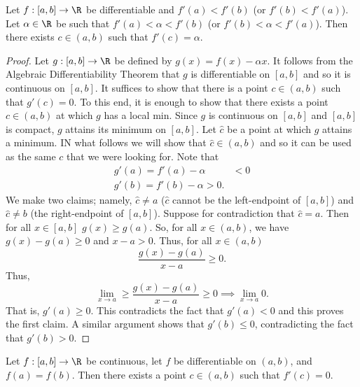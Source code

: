\begin{theorem}
    Let \( f: [a,b] \to \R  \) be differentiable and \( f'(a) < f'(b) \) (or \( f'(b) < f'(a) \)). Let \( \alpha \in \R  \) be such that \( f'(a) < \alpha < f'(b)  \) (or \( f'(b) < \alpha < f'(a) \)). Then there exists \( c \in (a,b) \) such that \( f'(c) = \alpha \).
\end{theorem}
\begin{proof}
    Let \( g:[a,b] \to \R  \) be defined by \( g(x) = f(x) - \alpha x  \). It follows from the Algebraic Differentiability Theorem that \( g  \) is differentiable on \( [a,b] \) and so it is continuous on \( [a,b] \). It suffices to show that there is a point \( c \in (a,b) \) such that \( g'(c) = 0 \). To this end, it is enough to show that there exists a point \( c \in (a,b) \) at which \( g  \) has a local min. Since \( g  \) is continuous on \( [a,b] \) and \( [a,b]  \) is compact, \( g  \) attains its minimum on \( [a,b] \). Let \( \hat{c} \) be a point at which \( g  \) attains a minimum. IN what follows we will show that \( \hat{c} \in (a,b) \) and so it can be used as the same \( c  \) that we were looking for. Note that  
    \begin{align*}
        g'(a) = f'(a) - \alpha &<  0 \\
        g'(b) = f'(b) - \alpha > 0. 
    \end{align*}
    We make two claims; namely, \( \hat{c} \neq a  \) (\( \hat{c}  \) cannot be the left-endpoint of \( [a,b] \)) and \( \hat{c} \neq b  \) (the right-endpoint of \( [a,b] \)). Suppose for contradiction that \( \hat{c}= a  \). Then for all \( x \in [a,b] \) \( g(x) \geq g(a) \). So, for all \( x \in (a,b) \), we have \( g(x) - g(a) \geq 0  \) and \( x - a > 0  \). Thus, for all \( x \in (a,b) \)
    \[  \frac{ g(x) - g(a) }{ x - a  }  \geq 0.  \]
    Thus, 
    \[  \lim_{ x \to a }  \geq \frac{ g(x) - g(a) }{  x - a  }  \geq 0 \implies \lim_{ x \to a  }  0.   \]
    That is, \( g'(a) \geq 0  \). This contradicts the fact that \( g'(a) < 0 \) and this proves the first claim.
    A similar argument shows that \( g'(b) \leq 0  \), contradicting the fact that \( g'(b) > 0  \).
\end{proof}

\begin{theorem}
    Let \( f: [a,b] \to \R  \) be continuous, let \( f  \) be differentiable on \( (a,b) \), and \( f(a) = f(b) \). Then there exists a point \( c \in (a,b) \) such that \( f'(c) = 0  \). 
\end{theorem}

